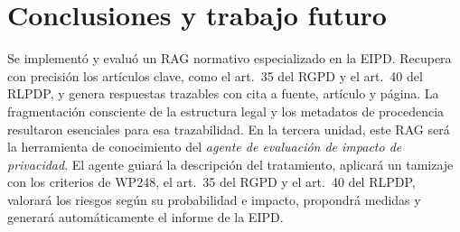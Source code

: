 \documentclass[conference]{IEEEtran}
\begin{document}
\section{Conclusiones y trabajo futuro}
Se implementó y evaluó un RAG normativo especializado en la EIPD. Recupera con precisión los artículos clave, como el art.~35 del RGPD y el art.~40 del RLPDP, y genera respuestas trazables con cita a fuente, artículo y página. La fragmentación consciente de la estructura legal y los metadatos de procedencia resultaron esenciales para esa trazabilidad. En la tercera unidad, este RAG será la herramienta de conocimiento del \emph{agente de evaluación de impacto de privacidad}. El agente guiará la descripción del tratamiento, aplicará un tamizaje con los criterios de WP248, el art.~35 del RGPD y el art.~40 del RLPDP, valorará los riesgos según su probabilidad e impacto, propondrá medidas y generará automáticamente el informe de la EIPD.



\end{document}
